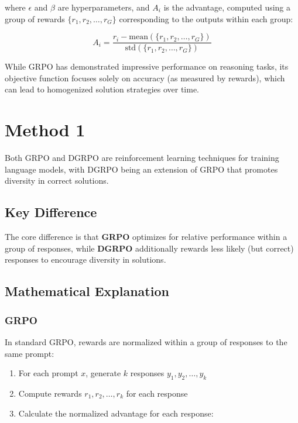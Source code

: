 \documentclass[10pt,twocolumn,letterpaper]{article}
\begin{document}
where $\epsilon$ and $\beta$ are hyperparameters, and $A_i$ is the advantage, computed using a group of rewards $\{r_1, r_2, \ldots, r_G\}$ corresponding to the outputs within each group:

\begin{equation}
A_i = \frac{r_i - \text{mean}(\{r_1, r_2, \ldots, r_G\})}{\text{std}(\{r_1, r_2, \ldots, r_G\})}
\end{equation}

While GRPO has demonstrated impressive performance on reasoning tasks, its objective function focuses solely on accuracy (as measured by rewards), which can lead to homogenized solution strategies over time.

\section{Method 1}

\maketitle

Both GRPO and DGRPO are reinforcement learning techniques for training language models, with DGRPO being an extension of GRPO that promotes diversity in correct solutions.

\subsection{Key Difference}

The core difference is that \textbf{GRPO} optimizes for relative performance within a group of responses, while \textbf{DGRPO} additionally rewards less likely (but correct) responses to encourage diversity in solutions.

\subsection{Mathematical Explanation}

\subsubsection{GRPO}

In standard GRPO, rewards are normalized within a group of responses to the same prompt:

\begin{enumerate}
  \item For each prompt $x$, generate $k$ responses $y_1, y_2, \ldots, y_k$
  \item Compute rewards $r_1, r_2, \ldots, r_k$ for each response
  \item Calculate the normalized advantage for each response:
\end{enumerate}
\end{document}
